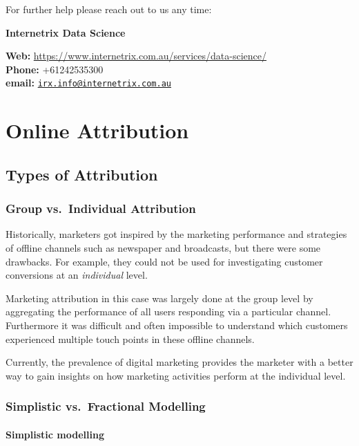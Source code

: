 \documentclass[]{book}
\begin{document}
For further help please reach out to us any time:

\textbf{Internetrix Data Science}

\textbf{Web:}
\url{https://www.internetrix.com.au/services/data-science/}\\
\textbf{Phone:} +61242535300\\
\textbf{email:}
\href{mailto:irx.info@internetrix.com.au}{\nolinkurl{irx.info@internetrix.com.au}}

\part{Online Attribution}\label{part-online-attribution}

\chapter{Types of Attribution}\label{types-of-attribution}

\section{Group vs.~Individual
Attribution}\label{group-vs.individual-attribution}

Historically, marketers got inspired by the marketing performance and
strategies of offline channels such as newspaper and broadcasts, but
there were some drawbacks. For example, they could not be used for
investigating customer conversions at an \emph{individual} level.

Marketing attribution in this case was largely done at the group level
by aggregating the performance of all users responding via a particular
channel. Furthermore it was difficult and often impossible to understand
which customers experienced multiple touch points in these offline
channels.

Currently, the prevalence of digital marketing provides the marketer
with a better way to gain insights on how marketing activities perform
at the individual level.

\section{Simplistic vs.~Fractional
Modelling}\label{simplistic-vs.fractional-modelling}

\subsection{Simplistic modelling}\label{simplistic-modelling}
\end{document}
